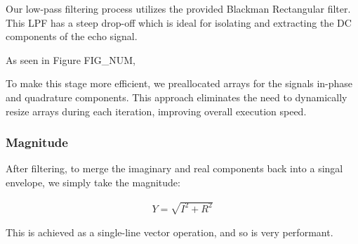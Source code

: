 Our low-pass filtering process utilizes the provided Blackman Rectangular filter. This LPF has 
a steep drop-off which is ideal for isolating and extracting the DC components of the echo signal.

As seen in Figure FIG_NUM, 

To make this stage more efficient, we preallocated arrays for the signals in-phase and quadrature
components. This approach eliminates the need to dynamically resize arrays during each iteration,
improving overall execution speed.


\subsubsection{Magnitude}

After filtering, to merge the imaginary and real components back into a singal envelope, we 
simply take the magnitude:

\begin{align*}
    Y = \sqrt{I^2 + R^2}
\end{align*}

This is achieved as a single-line vector operation, and so is very performant.